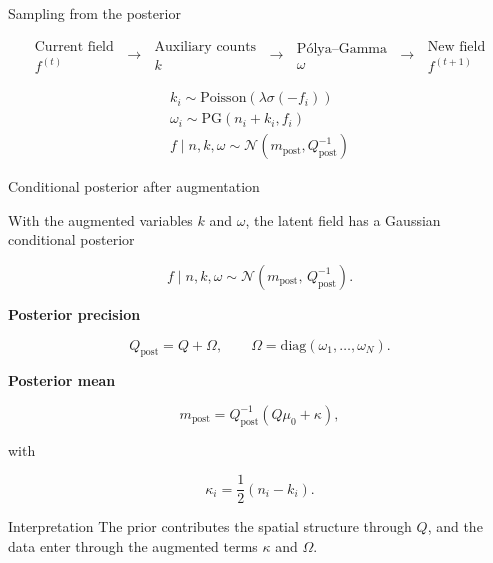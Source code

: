 \documentclass[11pt]{beamer}
\begin{document}
\begin{frame}{Sampling from the posterior}

$$\boxed{
\substack{
\text{Current field}\\
f^{(t)}
}}
\;\longrightarrow\;
\boxed{
\substack{
\text{Auxiliary counts}\\
k
}}
\;\longrightarrow\;
\boxed{
\substack{
\text{Pólya--Gamma}\\
\omega
}}
\;\longrightarrow\;
\boxed{
\substack{
\text{New field}\\
f^{(t+1)}
}}
$$

\vspace{0.6cm}


$$\begin{gathered}
k_i \sim \mathrm{Poisson}\!\left(\lambda\sigma(-f_i)\right)
\\[0.4cm]
\omega_i \sim \mathrm{PG}(n_i+k_i,f_i)
\\[0.4cm]
f\mid n,k,\omega \sim \mathcal{N}(m_{\mathrm{post}},Q_{\mathrm{post}}^{-1})
\end{gathered}$$

\end{frame}

\begin{frame}{Conditional posterior after augmentation}

With the augmented variables \(k\) and \(\omega\), the latent field has a Gaussian conditional posterior


$$f \mid n,k,\omega
\sim
\mathcal N\!\left(m_{\mathrm{post}},\,Q_{\mathrm{post}}^{-1}\right).$$

\vspace{0.3cm}

\textbf{Posterior precision}


$$Q_{\mathrm{post}} = Q + \Omega,
\qquad
\Omega = \mathrm{diag}(\omega_1,\dots,\omega_N).$$

\vspace{0.3cm}

\textbf{Posterior mean}


$$m_{\mathrm{post}} = Q_{\mathrm{post}}^{-1} \left( Q\mu_0 + \kappa\right),$$

with

$$\kappa_i = \frac{1}{2}(n_i-k_i).$$

\vspace{0.4cm}

\begin{block}{Interpretation}
The prior contributes the spatial structure through \(Q\), and the data enter
through the augmented terms \(\kappa\) and \(\Omega\).
\end{block}

\end{frame}
\end{document}
